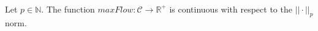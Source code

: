 \begin{theorem} \ \\
   \label{maxflowcont}
   Let $p \in \mathbb{N}$. The function $maxFlow : \mathcal{C} \rightarrow \mathbb{R}^{+}$ is continuous with respect to the
   $||\cdot||_p$ norm.
\end{theorem}
